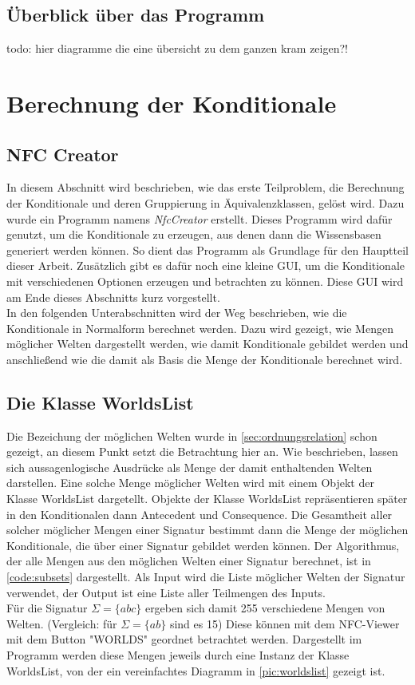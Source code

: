 \documentclass[12pt,a4paper]{article}
\begin{document}
\subsection{Überblick über das Programm}
todo: hier diagramme die eine übersicht zu dem ganzen kram zeigen?!

\section{Berechnung der Konditionale}


\subsection{NFC Creator}


In diesem Abschnitt wird beschrieben, wie das erste Teilproblem, die Berechnung der Konditionale und deren Gruppierung in Äquivalenzklassen, gelöst wird. Dazu wurde ein Programm namens \textit{NfcCreator} erstellt. Dieses Programm wird dafür genutzt, um die Konditionale zu erzeugen, aus denen dann die Wissensbasen generiert werden können. So dient das Programm als Grundlage für den Hauptteil dieser Arbeit. Zusätzlich gibt es dafür noch eine kleine GUI, um die Konditionale mit verschiedenen Optionen erzeugen und betrachten zu können. Diese GUI wird am Ende dieses Abschnitts kurz vorgestellt. \\
In den folgenden Unterabschnitten wird der Weg beschrieben, wie die Konditionale in Normalform berechnet werden. Dazu wird gezeigt, wie Mengen möglicher Welten dargestellt werden, wie damit Konditionale gebildet werden und anschließend wie die damit als Basis die Menge der Konditionale berechnet wird.



\subsection{Die Klasse WorldsList}
\label{sec:worldslist}
Die Bezeichung der möglichen Welten wurde in \autoref{sec:ordnungsrelation} schon gezeigt, an diesem Punkt setzt die Betrachtung hier an. Wie beschrieben, lassen sich aussagenlogische Ausdrücke als Menge der damit enthaltenden Welten darstellen. Eine solche Menge möglicher Welten wird mit einem Objekt der Klasse WorldsList dargetellt. Objekte der Klasse WorldsList repräsentieren später in den Konditionalen dann Antecedent und Consequence. Die Gesamtheit aller solcher möglicher Mengen einer Signatur bestimmt dann die Menge der möglichen Konditionale, die über einer Signatur gebildet werden können. Der Algorithmus, der alle Mengen aus den möglichen Welten einer Signatur berechnet, ist in \autoref{code:subsets} dargestellt. Als Input wird die Liste möglicher Welten der Signatur verwendet, der Output ist eine Liste aller Teilmengen des Inputs. \\
Für die Signatur $\Sigma = \{abc\}$ ergeben sich damit 255 verschiedene Mengen von Welten. (Vergleich: für $\Sigma=\{ab\}$ sind es 15) Diese können mit dem NFC-Viewer mit dem Button "WORLDS" \space geordnet betrachtet werden. Dargestellt im Programm werden diese Mengen jeweils durch eine Instanz der Klasse WorldsList, von der ein vereinfachtes Diagramm in \ref{pic:worldslist} gezeigt ist. 
\end{document}
